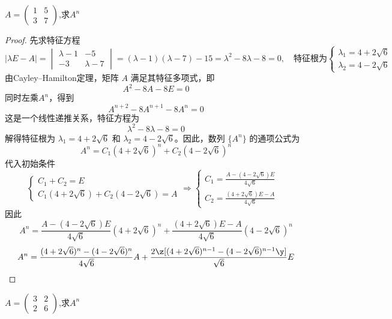 \begin{example}[复旦2024]
$ A=
\begin{pmatrix}1&5\\
               3&7\end{pmatrix}
$,求$A^n $
\end{example}

\begin{proof}
先求特征方程
\[ 
|\lambda E - A| = \begin{vmatrix} \lambda - 1 & -5 \\ -3 & \lambda - 7 \end{vmatrix} = (\lambda - 1)(\lambda - 7) - 15 = \lambda^2 - 8\lambda - 8 = 0,\quad \text{特征根为} 
\begin{cases}
\lambda_1 = 4 + 2\sqrt{6} & \\
\lambda_2 = 4 - 2\sqrt{6}& 
\end{cases}
\]
由Cayley–Hamilton定理，矩阵 \(A\) 满足其特征多项式，即
\[ A^2 - 8A - 8E = 0 \]
同时左乘$A^n$，得到
\[ A^{n+2} - 8A^{n+1} - 8A^n = 0 \]
这是一个线性递推关系，特征方程为
\[ \lambda^2 - 8\lambda - 8 = 0 \]
解得特征根为 \(\lambda_1 = 4 + 2\sqrt{6}\) 和 \(\lambda_2 = 4 - 2\sqrt{6}\)。因此，数列 \(\{A^n\}\) 的通项公式为
\[ A^n = C_1 ( 4 + 2\sqrt{6})^n + C_2 (4 - 2\sqrt{6})^n \]
代入初始条件
\[
\begin{cases}
C_1 + C_2 = E \\
C_1 ( 4 + 2\sqrt{6}) + C_2 (4 - 2\sqrt{6}) = A
\end{cases}  \Rightarrow 
\begin{cases}
C_1 = \frac{A - (4 - 2\sqrt{6})E}{4\sqrt{6}} & \\
C_2 = \frac{(4 + 2\sqrt{6})E - A}{4\sqrt{6}} &
\end{cases} \]
因此
\[ A^n = \frac{A - (4 - 2\sqrt{6})E}{4\sqrt{6}} ( 4 + 2\sqrt{6})^n + \frac{(4 + 2\sqrt{6})E - A}{4\sqrt{6}} (4 - 2\sqrt{6})^n \]
\[ A^n =\frac{(4+2\sqrt{6})^n-(4-2\sqrt{6})^n}{4\sqrt{6}} A + \frac{2\z[(4+2\sqrt{6})^{n-1}-(4-2\sqrt{6})^{n-1} \y]}{\sqrt{6}}E \]
\end{proof}


\vspace{1mm}
\begin{example}[复旦2018]
$ A=
\begin{pmatrix}3&2\\
               2&6\end{pmatrix}
$,求$A^n $
\end{example}


